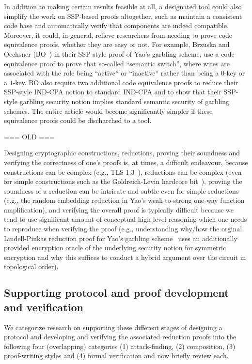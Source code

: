 In addition to making certain results feasible at all, a designated tool could 
also simplify the work on SSP-based proofs altogether, such as maintain a consistent
code base and automatically verify that components are indeed compatible.
Moreover, it could, in general, relieve researchers from needing to prove
code equivalence proofs, whether they are easy or not. For example, Brzuska
and Oechsner (BO~\cite{X}) in their SSP-style proof of Yao's garbling scheme,
use a code-equivalence proof to prove that so-called ``semantic switch'', where
wires are associated with the role being ``active'' or ``inactive'' rather than
being a $0$-key or a $1$-key. BO also require two additional code equivalence proofs
to reduce their SSP-style IND-CPA notion to standard IND-CPA and to show that their
SSP-style garbling security notion implies standard semantic security of garbling schemes. The entire article would become significantly simpler if these equivalence
proofs could be discharched to a tool.






\iffalse
=== OLD ===

Designing cryptographic constructions, reductions, proving their soundness and verifying the correctness of one's proofs is, at times, a difficult endeavour, because constructions can be complex (e.g., TLS 1.3~\cite{X}), reductions can be complex (even for simple constructions such as the Goldreich-Levin hardcore bit~\cite{X}), proving the soundness of a reduction can be intricate and subtle even for simple reductions (e.g., the random embedding reduction in Yao's weak-to-strong one-way function amplification), and verifying the overall proof is typically difficult because we tend to use significant amount of conceptual high-level reasoning which one needs to reproduce when verifying the proof (e.g., understanding why/how the orginal Lindell-Pinkas reduction proof for Yao's garbling scheme~\cite{X} uses an additionally provided encryption oracle of the underlying security notion for symmetric encryption and why this suffices to conduct a hybrid argument over the circuit in topological order).

\subsection{Supporting protocol and proof development and verification}
We categorize research on supporting these different stages of designing a protocol and developing and verifying the associated reduction proofs into the following four (overlapping) categories (1) attack-finding, (2) composition, (3) proof-writing styles and (4) formal verification and now briefly review each.

